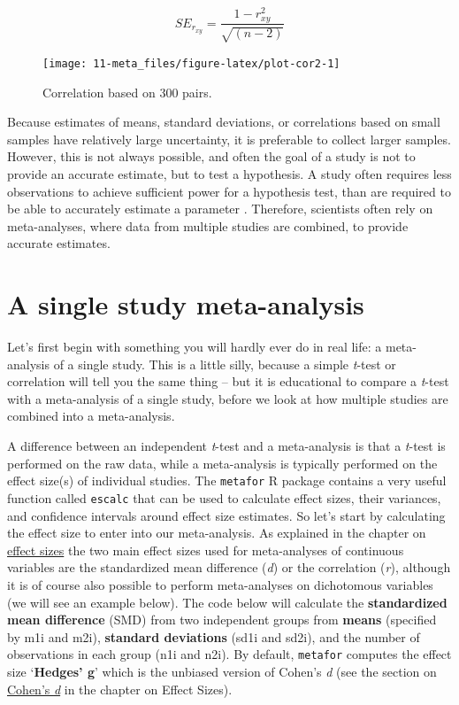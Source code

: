 \documentclass[
  oneside]{krantz}
\begin{document}
\[SE_{r_{xy}} = \frac{1 - r^2_{xy}}{\sqrt{(n - 2)}}\]



\begin{figure}

{\centering \texttt{[image: 11-meta\_files/figure-latex/plot-cor2-1]} 

}

\caption{Correlation based on 300 pairs.}\label{fig:plot-cor2}
\end{figure}

Because estimates of means, standard deviations, or correlations based on small samples have relatively large uncertainty, it is preferable to collect larger samples. However, this is not always possible, and often the goal of a study is not to provide an accurate estimate, but to test a hypothesis. A study often requires less observations to achieve sufficient power for a hypothesis test, than are required to be able to accurately estimate a parameter \citep{maxwell_sample_2008}. Therefore, scientists often rely on meta-analyses, where data from multiple studies are combined, to provide accurate estimates.

\hypertarget{a-single-study-meta-analysis}{%
\section{A single study meta-analysis}\label{a-single-study-meta-analysis}}

Let's first begin with something you will hardly ever do in real life: a meta-analysis of a single study. This is a little silly, because a simple \emph{t}-test or correlation will tell you the same thing -- but it is educational to compare a \emph{t}-test with a meta-analysis of a single study, before we look at how multiple studies are combined into a meta-analysis.

A difference between an independent \emph{t}-test and a meta-analysis is that a \emph{t}-test is performed on the raw data, while a meta-analysis is typically performed on the effect size(s) of individual studies. The \texttt{metafor} R package contains a very useful function called \texttt{escalc} that can be used to calculate effect sizes, their variances, and confidence intervals around effect size estimates. So let's start by calculating the effect size to enter into our meta-analysis. As explained in the chapter on \protect\hyperlink{effectsize}{effect sizes} the two main effect sizes used for meta-analyses of continuous variables are the standardized mean difference (\emph{d}) or the correlation (\emph{r}), although it is of course also possible to perform meta-analyses on dichotomous variables (we will see an example below). The code below will calculate the \textbf{standardized mean difference} (SMD) from two independent groups from \textbf{means} (specified by m1i and m2i), \textbf{standard deviations} (sd1i and sd2i), and the number of observations in each group (n1i and n2i). By default, \texttt{metafor} computes the effect size `\textbf{Hedges' g}' which is the unbiased version of Cohen's \emph{d} (see the section on \protect\hyperlink{cohend}{Cohen's \emph{d}} in the chapter on Effect Sizes).
\end{document}
